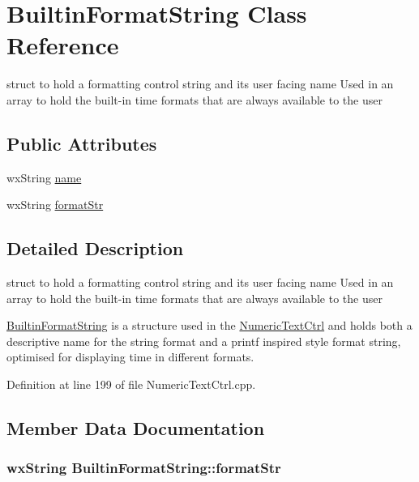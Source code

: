 \hypertarget{struct_builtin_format_string}{}\section{Builtin\+Format\+String Class Reference}
\label{struct_builtin_format_string}


struct to hold a formatting control string and its user facing name Used in an array to hold the built-\/in time formats that are always available to the user  


\subsection*{Public Attributes}
\begin{DoxyCompactItemize}
\item 
wx\+String \hyperlink{struct_builtin_format_string_a7166ff344a8c117c84e12e97dd86b3c1}{name}
\item 
wx\+String \hyperlink{struct_builtin_format_string_a9b709d75e1deae4ef031de715d81859b}{format\+Str}
\end{DoxyCompactItemize}


\subsection{Detailed Description}
struct to hold a formatting control string and its user facing name Used in an array to hold the built-\/in time formats that are always available to the user 

\hyperlink{struct_builtin_format_string}{Builtin\+Format\+String} is a structure used in the \hyperlink{class_numeric_text_ctrl}{Numeric\+Text\+Ctrl} and holds both a descriptive name for the string format and a printf inspired style format string, optimised for displaying time in different formats. 

Definition at line 199 of file Numeric\+Text\+Ctrl.\+cpp.



\subsection{Member Data Documentation}
\subsubsection[{\texorpdfstring{format\+Str}{formatStr}}]{\setlength{\rightskip}{0pt plus 5cm}wx\+String Builtin\+Format\+String\+::format\+Str}\hypertarget{struct_builtin_format_string_a9b709d75e1deae4ef031de715d81859b}{}\label{struct_builtin_format_string_a9b709d75e1deae4ef031de715d81859b}


